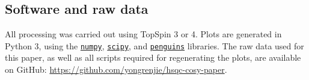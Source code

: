 \documentclass[a4paper,12pt]{article}
\begin{document}
\begin{refsection}
\startcontents[si]
\vfill
\hspace{0pt}
\newpage

\section{Software and raw data}

All processing was carried out using TopSpin 3 or 4.
Plots are generated in Python 3, using the \href{https://github.com/numpy/numpy}{\texttt{numpy}}, \href{https://github.com/scipy/scipy}{\texttt{scipy}}, and \href{https://github.com/yongrenjie/penguins}{\texttt{penguins}} libraries.
The raw data used for this paper, as well as all scripts required for regenerating the plots, are available on GitHub: \url{https://github.com/yongrenjie/hsqc-cosy-paper}.

\AtNextBibliography{\small}
\printbibliography{}
\clearpage    %

\end{refsection}
\end{document}
